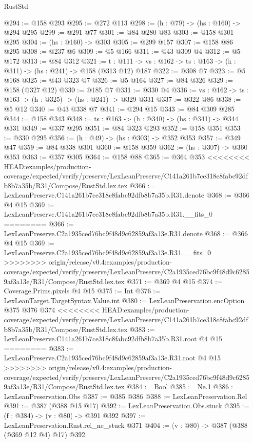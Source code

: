 \begin{lexlean}{RustStd}
\begin{coremodule}
{\begin{coremodule}
@294 := @158 @293
@295 := @272 @113
@298 := (h : @79) -> (hs : @160) -> @294 @295
@299 := @291 @77
@301 := @84 @280 @83
@303 := @158 @301 @295
@304 := (hs : @160) -> @303
@305 := @299 @157
@307 := @158 @86 @295
@308 := @237 @6
@309 := @5 @166
@311 := @43 @309 @4
@312 := @5 @172
@313 := @84 @312
@321 := {t : @111} ->
  {vs : @162} -> {ts : @163} -> (h : @311) -> (hs : @241) -> @158 (@313 @12) @187
@322 := @308 @7
@323 := @5 @168
@325 := @43 @323 @7
@326 := @5 @164
@327 := @84 @326
@329 := @158 (@327 @12)
@330 := @185 @7
@331 := @330 @4
@336 := {vs : @162} -> {ts : @163} -> (h : @325) -> (hs : @241) -> @329 @331
@337 := @322 @86
@338 := @5 @12
@340 := @43 @338 @7
@341 := @294 @15
@343 := @84 @309 @285
@344 := @158 @343
@348 := {ts : @163} -> (h : @340) -> (hs : @341) -> @344 @331
@349 := @337 @295
@351 := @84 @323 @293
@352 := @158 @351
@353 := @330 @295
@356 := (h : @49) -> (hs : @303) -> @352 @353
@357 := @349 @47
@359 := @84 @338 @301
@360 := @158 @359
@362 := (hs : @307) -> @360 @353
@363 := @357 @305
@364 := @158 @88
@365 := @364 @353
<<<<<<<< HEAD:examples/production-coverage/expected/verify/preserve/LexLeanPreserve/C141a261b7ce318c8fabc92dfb8b7a35b/R31/Compose/RustStd.lex.tex
@366 := LexLeanPreserve.C141a261b7ce318c8fabc92dfb8b7a35b.R31.denote
@368 := @366 @4 @15
@369 := LexLeanPreserve.C141a261b7ce318c8fabc92dfb8b7a35b.R31.__fits_0
========
@366 := LexLeanPreserve.C2a1935ced76bc9f48d9c62859af3a13e.R31.denote
@368 := @366 @4 @15
@369 := LexLeanPreserve.C2a1935ced76bc9f48d9c62859af3a13e.R31.__fits_0
>>>>>>>> origin/release/v0.4:examples/production-coverage/expected/verify/preserve/LexLeanPreserve/C2a1935ced76bc9f48d9c62859af3a13e/R31/Compose/RustStd.lex.tex
@371 := @369 @4 @15
@374 := Coverage.Prims.pixels @4 @15
@375 := Int
@376 := LexLeanTarget.TargetSyntax.Value.int
@380 := LexLeanPreservation.encOption @375 @376 @374
<<<<<<<< HEAD:examples/production-coverage/expected/verify/preserve/LexLeanPreserve/C141a261b7ce318c8fabc92dfb8b7a35b/R31/Compose/RustStd.lex.tex
@383 := LexLeanPreserve.C141a261b7ce318c8fabc92dfb8b7a35b.R31.root @4 @15
========
@383 := LexLeanPreserve.C2a1935ced76bc9f48d9c62859af3a13e.R31.root @4 @15
>>>>>>>> origin/release/v0.4:examples/production-coverage/expected/verify/preserve/LexLeanPreserve/C2a1935ced76bc9f48d9c62859af3a13e/R31/Compose/RustStd.lex.tex
@384 := Bool
@385 := Ne.{1}
@386 := LexLeanPreservation.Obs
@387 := @385 @386
@388 := LexLeanPreservation.Rel
@391 := @387 (@388 @15 @17)
@392 := LexLeanPreservation.Obs.stuck
@395 := (f : @384) -> (v : @80) -> @391 @392
@397 := LexLeanPreservation.Rust.rel_ne_stuck @371
@404 := (v : @80) -> @387 (@388 (@369 @12 @4) @17) @392

\end{coremodule}}
\end{coremodule}
\end{lexlean}
